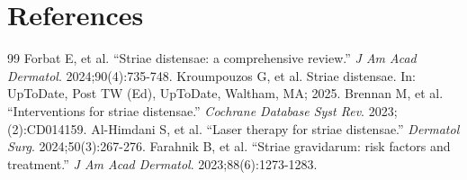 \section*{References}
\begin{thebibliography}{99}
 Forbat E, et al. ``Striae distensae: a comprehensive review.'' \emph{J Am Acad Dermatol}. 2024;90(4):735-748.
 Kroumpouzos G, et al. Striae distensae. In: UpToDate, Post TW (Ed), UpToDate, Waltham, MA; 2025.
 Brennan M, et al. ``Interventions for striae distensae.'' \emph{Cochrane Database Syst Rev}. 2023;(2):CD014159.
 Al-Himdani S, et al. ``Laser therapy for striae distensae.'' \emph{Dermatol Surg}. 2024;50(3):267-276.
 Farahnik B, et al. ``Striae gravidarum: risk factors and treatment.'' \emph{J Am Acad Dermatol}. 2023;88(6):1273-1283.
\end{thebibliography}
